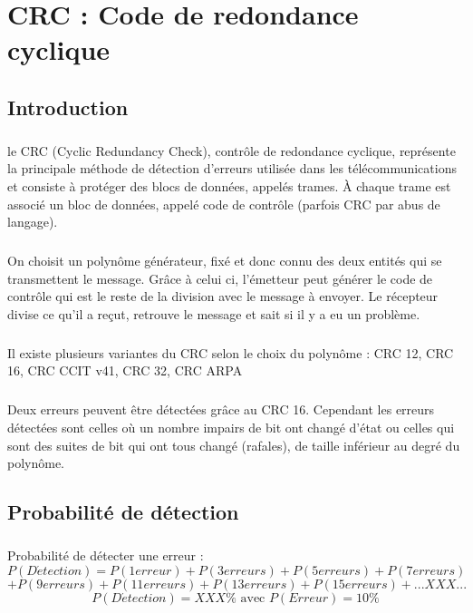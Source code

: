 
\chapter{CRC : Code de redondance cyclique}

    \section{Introduction}

        \paragraph{}
le CRC (Cyclic Redundancy Check), contrôle de redondance cyclique,
représente la principale méthode de détection d'erreurs utilisée dans les télécommunications et
consiste à protéger des blocs de données, appelés trames.
À chaque trame est associé un bloc de données, appelé code de contrôle (parfois CRC par abus de langage).
        \paragraph{}
On choisit un polynôme générateur, fixé et donc connu des deux entités qui se transmettent le message.
Grâce à celui ci, l'émetteur peut générer le code de contrôle qui est le reste de la division avec le message à envoyer.
Le récepteur divise ce qu'il a reçut, retrouve le message et sait si il y a eu un problème.
        \paragraph{}
Il existe plusieurs variantes du CRC selon le choix du polynôme : CRC 12, CRC 16, CRC CCIT v41, CRC 32, CRC ARPA
        \paragraph{}
Deux erreurs peuvent être détectées grâce au CRC 16.
Cependant les erreurs détectées sont celles où un nombre impairs de bit ont changé d'état ou
celles qui sont des suites de bit qui ont tous changé (rafales), de taille inférieur au
degré du polynôme.


    \section{Probabilité de détection}

        \paragraph{}
Probabilité de détecter une erreur :
\[  P(D\acute{e}tection) = P(1 erreur) + P(3 erreurs) + P(5 erreurs) + P(7 erreurs) \]
\[  + P(9 erreurs) + P(11 erreurs) + P(13 erreurs) + P(15 erreurs) + ...XXX... \]
\[  P(D\acute{e}tection) =  XXX\% \text{ avec } P( Erreur ) = 10\% \]


